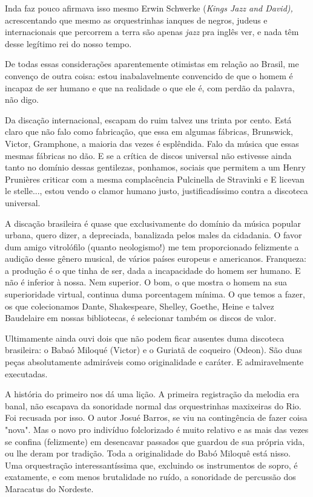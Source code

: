 Inda faz pouco afirmava isso mesmo Erwin Schwerke (\emph{Kings Jazz and
David),} acrescentando que mesmo as orquestrinhas ianques de negros,
judeus e internacionais que percorrem a terra são apenas \emph{jazz} pra
inglês ver, e nada têm desse legítimo rei do nosso tempo.

De todas essas considerações aparentemente otimistas em relação ao
Brasil, me convenço de outra coisa: estou inabalavelmente convencido de
que o homem é incapaz de ser humano e que na realidade o que ele é, com
perdão da palavra, não digo.

Da discação internacional, escapam do ruim talvez uns trinta por cento.
Está claro que não falo como fabricação, que essa em algumas fábricas,
Brunswick, Victor, Gramphone, a maioria das vezes é esplêndida. Falo da
música que essas mesmas fábricas no dão. E se a crítica de discos
universal não estivesse ainda tanto no domínio dessas gentilezas,
ponhamos, sociais que permitem a um Henry Prunières criticar com a mesma
complacência Pulcinella de Stravinki e E licevan le stelle..., estou
vendo o clamor humano justo, justificadíssimo contra a discoteca
universal.

A discação brasileira é quase que exclusivamente do domínio da música
popular urbana, quero dizer, a depreciada, banalizada pelos males da
cidadania. O favor dum amigo vitrolófilo (quanto neologismo!) me tem
proporcionado felizmente a audição desse gênero musical, de vários
países europeus e americanos. Franqueza: a produção é o que tinha de
ser, dada a incapacidade do homem ser humano. E não é inferior à nossa.
Nem superior. O bom, o que mostra o homem na sua superioridade virtual,
continua duma porcentagem mínima. O que temos a fazer, os que
colecionamos Dante, Shakespeare, Shelley, Goethe, Heine e talvez
Baudelaire em nossas bibliotecas, é selecionar também os discos de
valor.

Ultimamente ainda ouvi dois que não podem ficar ausentes duma discoteca
brasileira: o Babaó Miloqué (Victor) e o Guriatã de coqueiro (Odeon).
São duas peças absolutamente admiráveis como originalidade e caráter. E
admiravelmente executadas.

A história do primeiro nos dá uma lição. A primeira registração da
melodia era banal, não escapava da sonoridade normal das orquestrinhas
maxixeiras do Rio. Foi recusada por isso. O autor Josué Barros, se viu
na contingência de fazer coisa "nova". Mas o novo pro indivíduo
folclorizado é muito relativo e as mais das vezes se confina
(felizmente) em desencavar passados que guardou de sua própria vida, ou
lhe deram por tradição. Toda a originalidade do Babó Miloquê está nisso.
Uma orquestração interessantíssima que, excluindo os instrumentos de
sopro, é exatamente, e com menos brutalidade no ruído, a sonoridade de
percussão dos Maracatus do Nordeste.

